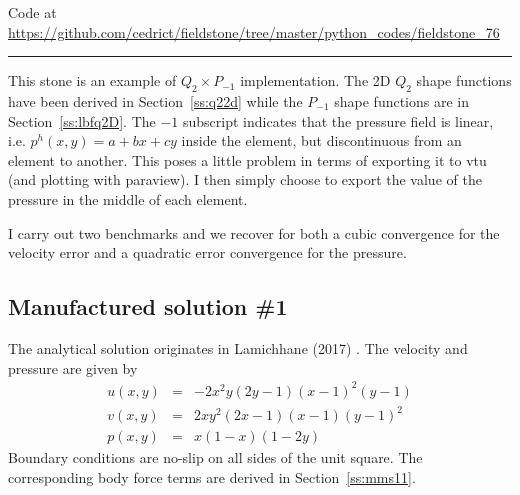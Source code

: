 

\begin{center}
Code at \url{https://github.com/cedrict/fieldstone/tree/master/python_codes/fieldstone_76}
\end{center}

\par\noindent\rule{\textwidth}{0.4pt}



This stone is an example of $Q_2\times P_{-1}$ implementation. 
The 2D $Q_2$ shape functions have been derived in Section~\ref{ss:q22d}
while the $P_{-1}$ shape functions are in Section~\ref{ss:lbfq2D}.
The $-1$ subscript indicates that the pressure field is linear, 
i.e. $p^h(x,y)=a+bx+cy$ inside the element, but discontinuous 
from an element to another. 
This poses a little problem in terms of exporting it to vtu (and plotting with paraview).
I then simply choose to export the value of the pressure in the middle of 
each element. 

I carry out two benchmarks and we recover for both a cubic convergence 
for the velocity error and a quadratic error convergence for the pressure.

\subsection*{Manufactured solution \#1}

The analytical solution originates in Lamichhane (2017) \cite{lami17}.
The velocity and pressure are given by
\begin{eqnarray}
u(x,y)&=&-2x^2y(2y-1)(x-1)^2(y-1) \\
v(x,y)&=& 2xy^2(2x-1)(x-1)(y-1)^2 \\
p(x,y)&=& x(1-x)(1-2y)
\end{eqnarray}
Boundary conditions are no-slip on all sides of the unit square. 
The corresponding body force terms are derived in Section~\ref{ss:mms11}. 

